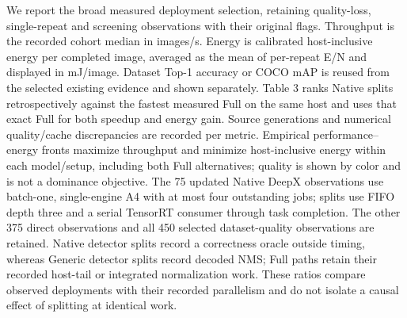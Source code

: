 We report the broad measured deployment selection, retaining quality-loss, single-repeat and screening observations with their original flags. Throughput is the recorded cohort median in images/\allowbreak{}s. Energy is calibrated host-inclusive energy per completed image, averaged as the mean of per-repeat E/\allowbreak{}N and displayed in mJ/\allowbreak{}image. Dataset Top-1 accuracy or COCO mAP is reused from the selected existing evidence and shown separately. Table 3 ranks Native splits retrospectively against the fastest measured Full on the same host and uses that exact Full for both speedup and energy gain. Source generations and numerical quality/\allowbreak{}cache discrepancies are recorded per metric. Empirical performance--energy fronts maximize throughput and minimize host-inclusive energy within each model/\allowbreak{}setup, including both Full alternatives; quality is shown by color and is not a dominance objective. The 75 updated Native DeepX observations use batch-one, single-engine A4 with at most four outstanding jobs; splits use FIFO depth three and a serial TensorRT consumer through task completion. The other 375 direct observations and all 450 selected dataset-quality observations are retained. Native detector splits record a correctness oracle outside timing, whereas Generic detector splits record decoded NMS; Full paths retain their recorded host-tail or integrated normalization work. These ratios compare observed deployments with their recorded parallelism and do not isolate a causal effect of splitting at identical work.
